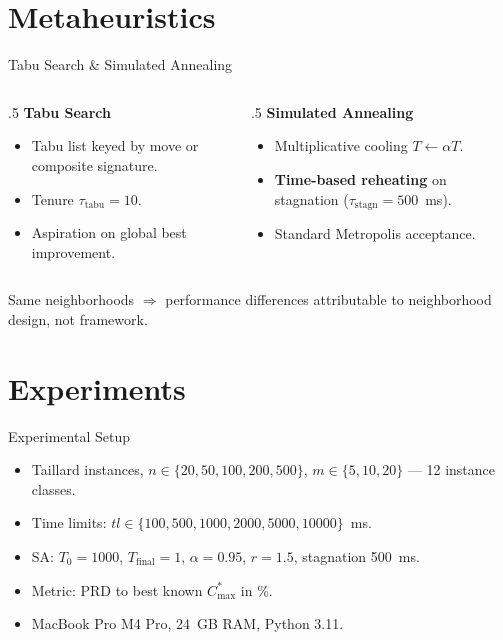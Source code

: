 \documentclass[aspectratio=169]{beamer}
\begin{document}
\section{Metaheuristics}
\begin{frame}{Tabu Search \& Simulated Annealing}
    \begin{columns}
        \begin{column}{.5\textwidth}
            \textbf{Tabu Search}
            \begin{itemize}
                \item Tabu list keyed by move or composite signature.
                \item Tenure $\tau_{\text{tabu}} = 10$.
                \item Aspiration on global best improvement.
            \end{itemize}
        \end{column}
        \begin{column}{.5\textwidth}
            \textbf{Simulated Annealing}
            \begin{itemize}
                \item Multiplicative cooling $T \leftarrow \alpha T$.
                \item \textbf{Time-based reheating} on stagnation ($\tau_{\mathrm{stagn}}=500$~ms).
                \item Standard Metropolis acceptance.
            \end{itemize}
        \end{column}
    \end{columns}

    \vspace{0.5cm}
    \centering Same neighborhoods $\Rightarrow$ performance differences attributable to neighborhood design, not framework.
\end{frame}

\section{Experiments}
\begin{frame}{Experimental Setup}
    \begin{itemize}
        \item Taillard instances, $n \in \{20, 50, 100, 200, 500\}$, $m \in \{5, 10, 20\}$ --- 12 instance classes.
        \item Time limits: $tl \in \{100, 500, 1000, 2000, 5000, 10000\}$~ms.
        \item SA: $T_0 = 1000$, $T_{\mathrm{final}} = 1$, $\alpha = 0.95$, $r = 1.5$, stagnation 500~ms.
        \item Metric: PRD to best known $C_{\max}^{*}$ in \%.
        \item MacBook Pro M4 Pro, 24~GB RAM, Python 3.11.
    \end{itemize}
\end{frame}
\end{document}
